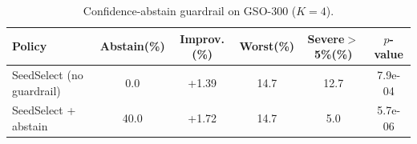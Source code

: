 \begin{table}[t]
  \centering
  \caption{Confidence-abstain guardrail on GSO-300 ($K{=}4$).}
  \label{tab:guardrail_abstain}
  \begin{tabular}{lccccc}
    \toprule
    Policy & Abstain(\%) & Improv.(\%) & Worst(\%) & Severe$>$5\%(\%) & $p$-value \\
    \midrule
    SeedSelect (no guardrail) & 0.0 & +1.39 & 14.7 & 12.7 & 7.9e-04 \\
    SeedSelect + abstain & 40.0 & +1.72 & 14.7 & 5.0 & 5.7e-06 \\
    \bottomrule
  \end{tabular}
\end{table}
